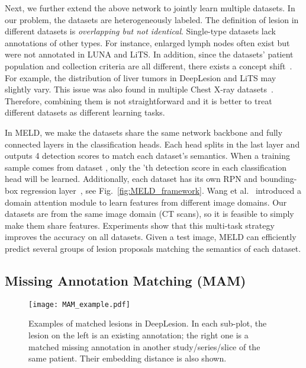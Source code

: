 \documentclass[runningheads]{llncs}
\def\Fig#1{{Fig.~\ref{fig:#1}}}
\def\etal{{et al.}}
\begin{document}
Next, we further extend the above network to jointly learn multiple datasets. In our problem, the datasets are heterogeneously labeled. The definition of lesion in different datasets is \textit{overlapping but not identical}. Single-type datasets lack annotations of other types. For instance, enlarged lymph nodes often exist but were not annotated in LUNA and LiTS. In addition, since the datasets' patient population and collection criteria are all different, there exists a concept shift~\cite{Cohen2020domain,Pan2010transfer}. For example, the distribution of liver tumors in DeepLesion and LiTS may slightly vary. This issue was also found in multiple Chest X-ray datasets~\cite{Cohen2020domain}. Therefore, combining them is not straightforward and it is better to treat different datasets as different learning tasks.

In MELD, we make the datasets share the same network backbone and fully connected layers in the classification heads. Each head splits in the last layer and outputs 4 detection scores to match each dataset's semantics. When a training sample comes from dataset , only the 'th detection score in each classification head will be learned. Additionally, each dataset has its own RPN and bounding-box regression layer~\cite{Wang2019universal}, see \Fig{MELD_framework}. Wang \etal~\cite{Wang2019universal} introduced a domain attention module to learn features from different image domains. Our datasets are from the same image domain (CT scans), so it is feasible to simply make them share features. Experiments show that this multi-task strategy improves the accuracy on all datasets. Given a test image, MELD can efficiently predict several groups of lesion proposals matching the semantics of each dataset.

\subsection{Missing Annotation Matching (MAM)}
\label{subsec:MAM}

\begin{figure}[t]
	\centering
	\texttt{[image: MAM\_example.pdf]} \caption{Examples of matched lesions in DeepLesion. In each sub-plot, the lesion on the left is an existing annotation; the right one is a matched missing annotation in another study/series/slice of the same patient. Their embedding distance is also shown.}
	\label{fig:MAM_example} \vspace{-3mm}
\end{figure}
\end{document}
